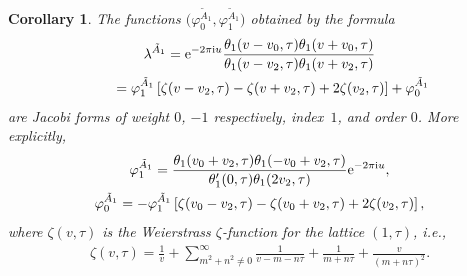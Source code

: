 \documentclass[10pt,a4paper]{amsart}
\numberwithin{equation}{section}
\newtheorem{Corollary}[Theorem]{Corollary}
\begin{document}
\begin{Corollary}
The functions $\big(\varphi_0^{\tilde A_1},\varphi_1^{\tilde A_1}\big)$ obtained by the formula
\begin{gather}
\lambda^{\tilde A_1}={\rm e}^{-2\pi {\rm i} u}\frac{\theta_1(v-v_0,\tau)\theta_1(v+v_0,\tau)}
{\theta_1(v-v_2,\tau)\theta_1(v+v_2,\tau)}\nonumber
\\ \hphantom{\lambda^{\tilde A_1}}
{}=\varphi_{1}^{\tilde A_1}\left[\zeta(v-v_2,\tau)-\zeta(v+v_{2},\tau)+2\zeta(v_2,\tau)\right]+\varphi_0^{\tilde A_1}
\label{superpotentialA1}
\end{gather}
 are Jacobi forms of weight $0$, $-1$ respectively, index~$1$, and order $0$. More explicitly,
\begin{gather}
\varphi_{1}^{\tilde A_1}=\frac{\theta_1(v_0+v_2,\tau)\theta_1(-v_0+v_2,\tau)}{\theta^{\prime}_1(0,\tau)\theta_1(2v_2,\tau)}{\rm e}^{-2\pi {\rm i} u},\nonumber
\\
\varphi_{0}^{\tilde A_1}=-\varphi_{1}^{\tilde A_1}\left[\zeta(v_0-v_2,\tau)-\zeta(v_0+v_{2},\tau)+2\zeta(v_2,\tau)\right],
\label{thetaformulainvariant}
\end{gather}
where $\zeta(v,\tau)$ is the Weierstrass $\zeta$-function for the lattice $(1,\tau)$, i.e.,
\begin{gather*}
\zeta(v,\tau)=\frac{1}{v}+\sum_{m^2+n^2\neq 0}^{\infty} \frac{1}{v-m-n\tau}+\frac{1}{m+n\tau}+\frac{v}{(m+n\tau)^2}.
\end{gather*}
\end{Corollary}
\end{document}
